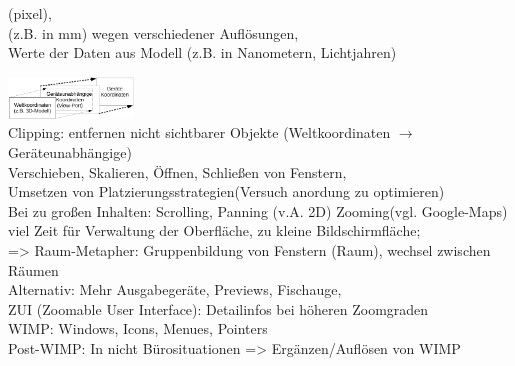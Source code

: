 

 (pixel), \\
 (z.B. in mm) wegen verschiedener Auflösungen, \\
 Werte der Daten aus Modell (z.B. in Nanometern, Lichtjahren)

\includegraphics[width=0.25\textwidth]{ViewPort}\\
Clipping: entfernen nicht sichtbarer Objekte (Weltkoordinaten $\rightarrow$ Geräteunabhängige)\\

Verschieben, Skalieren, Öffnen, Schließen von Fenstern,\\
Umsetzen von Platzierungsstrategien(Versuch anordung zu optimieren)\\
Bei zu großen Inhalten: Scrolling, Panning (v.A. 2D) Zooming(vgl. Google-Maps)\\

viel Zeit für Verwaltung der Oberfläche, zu kleine Bildschirmfläche;\\
=> Raum-Metapher: Gruppenbildung von Fenstern (Raum), wechsel zwischen Räumen\\
Alternativ: Mehr Ausgabegeräte, Previews, Fischauge,\\
ZUI (Zoomable User Interface): Detailinfos bei höheren Zoomgraden\\

WIMP: Windows, Icons, Menues, Pointers\\
Post-WIMP: In nicht Bürosituationen => Ergänzen/Auflösen von WIMP\\


